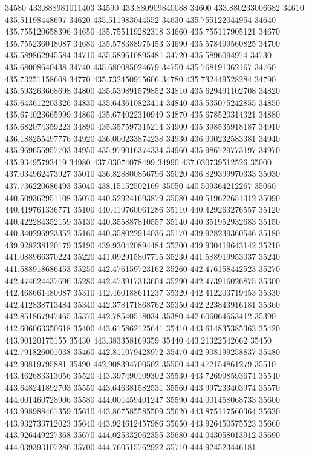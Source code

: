 {34580 433.888981011403
34590 433.880909840088
34600 433.880233006682
34610 435.51198448697
34620 435.511983044552
34630 435.755122044954
34640 435.755120658396
34650 435.755119282318
34660 435.755117905121
34670 435.755236048087
34680 435.578388975453
34690 435.578499560825
34700 435.589862945584
34710 435.589610895481
34720 435.5896094974
34730 435.68008640438
34740 435.680085024679
34750 435.768191362167
34760 435.73251158608
34770 435.732450915606
34780 435.732449528284
34790 435.593263668698
34800 435.539891579852
34810 435.629491102708
34820 435.643612203326
34830 435.643610823414
34840 435.535075242855
34850 435.674023665999
34860 435.674022310949
34870 435.678520314321
34880 435.682074359223
34890 435.357597315214
34900 435.398535918187
34910 436.188255497776
34920 436.000233874238
34930 436.000232583381
34940 435.969655957703
34950 435.979016374334
34960 435.986729773197
34970 435.93495793419
34980 437.03074078499
34990 437.030739512526
35000 437.034962473927
35010 436.828800856796
35020 436.829399970333
35030 437.736220686493
35040 438.15152502169
35050 440.509364212267
35060 440.509362951108
35070 440.529241693879
35080 440.519622651312
35090 440.419761336771
35100 440.419760061286
35110 440.429263276557
35120 440.422284352159
35130 440.355887810557
35140 440.351952932683
35150 440.340296923352
35160 440.358022914036
35170 439.928239360546
35180 439.928238120179
35190 439.930420894484
35200 439.930419643142
35210 441.088966370224
35220 441.092915807715
35230 441.588919953037
35240 441.588918686453
35250 442.476159723162
35260 442.476158442523
35270 442.474624437696
35280 442.473917313604
35290 442.473916026875
35300 442.468661480087
35310 442.460188611237
35320 442.412203719453
35330 442.412838713484
35340 442.378171868762
35350 442.223843916181
35360 442.851867947465
35370 442.78540518034
35380 442.606064653412
35390 442.606063350618
35400 443.615862125641
35410 443.614835385363
35420 443.90120175155
35430 443.383358169359
35440 443.21322542662
35450 442.791826001038
35460 442.811079428972
35470 442.908199258837
35480 442.90819795881
35490 442.908394700502
35500 443.472154861279
35510 443.462683313056
35520 443.397490109302
35530 443.726998593674
35540 443.648241892703
35550 443.646381582531
35560 443.997233403974
35570 444.001460728906
35580 444.001459401247
35590 444.001458068733
35600 443.998988461359
35610 443.867585585509
35620 443.875117560364
35630 443.932733712023
35640 443.924612457986
35650 443.926450575523
35660 443.926449227368
35670 444.025332062355
35680 444.043058013912
35690 444.039393107286
35700 444.760515762922
35710 444.924523446181
}
